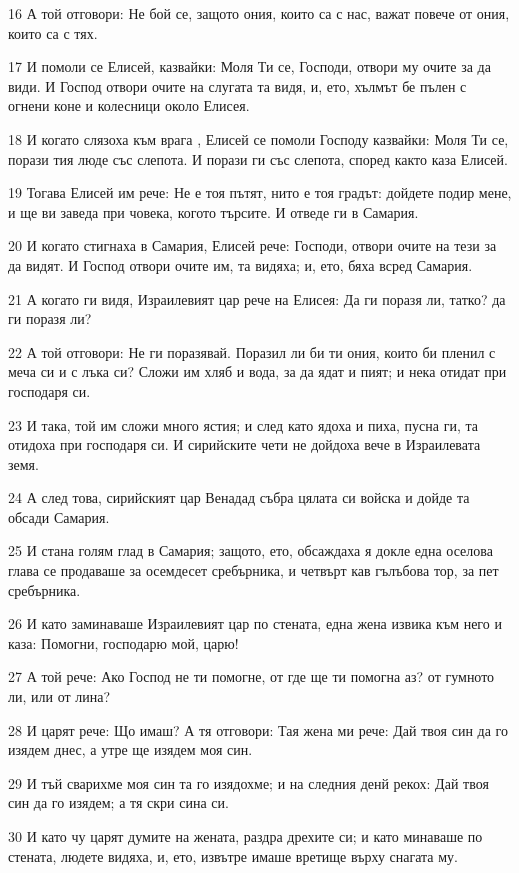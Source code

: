 \par 16 А той отговори: Не бой се, защото ония, които са с нас, важат повече от ония, които са с тях.
\par 17 И помоли се Елисей, казвайки: Моля Ти се, Господи, отвори му очите за да види. И Господ отвори очите на слугата та видя, и, ето, хълмът бе пълен с огнени коне и колесници около Елисея.
\par 18 И когато слязоха към врага , Елисей се помоли Господу казвайки: Моля Ти се, порази тия люде със слепота. И порази ги със слепота, според както каза Елисей.
\par 19 Тогава Елисей им рече: Не е тоя пътят, нито е тоя градът: дойдете подир мене, и ще ви заведа при човека, когото търсите. И отведе ги в Самария.
\par 20 И когато стигнаха в Самария, Елисей рече: Господи, отвори очите на тези за да видят. И Господ отвори очите им, та видяха; и, ето, бяха всред Самария.
\par 21 А когато ги видя, Израилевият цар рече на Елисея: Да ги поразя ли, татко? да ги поразя ли?
\par 22 А той отговори: Не ги поразявай. Поразил ли би ти ония, които би пленил с меча си и с лъка си? Сложи им хляб и вода, за да ядат и пият; и нека отидат при господаря си.
\par 23 И така, той им сложи много ястия; и след като ядоха и пиха, пусна ги, та отидоха при господаря си. И сирийските чети не дойдоха вече в Израилевата земя.
\par 24 А след това, сирийският цар Венадад събра цялата си войска и дойде та обсади Самария.
\par 25 И стана голям глад в Самария; защото, ето, обсаждаха я докле една оселова глава се продаваше за осемдесет сребърника, и четвърт кав гълъбова тор, за пет сребърника.
\par 26 И като заминаваше Израилевият цар по стената, една жена извика към него и каза: Помогни, господарю мой, царю!
\par 27 А той рече: Ако Господ не ти помогне, от где ще ти помогна аз? от гумното ли, или от лина?
\par 28 И царят рече: Що имаш? А тя отговори: Тая жена ми рече: Дай твоя син да го изядем днес, а утре ще изядем моя син.
\par 29 И тъй сварихме моя син та го изядохме; и на следния денй рекох: Дай твоя син да го изядем; а тя скри сина си.
\par 30 И като чу царят думите на жената, раздра дрехите си; и като минаваше по стената, людете видяха, и, ето, извътре имаше вретище върху снагата му.
